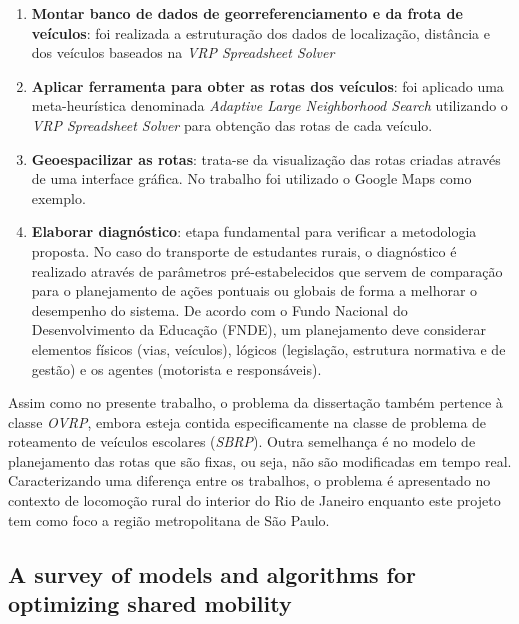 \begin{enumerate}
    \item \textbf{Montar banco de dados de georreferenciamento e da frota de veículos}: foi realizada a estruturação dos dados de localização, distância e dos veículos baseados na \emph{VRP Spreadsheet Solver}
    
    \item \textbf{Aplicar ferramenta para obter as rotas dos veículos}: foi aplicado uma meta-heurística denominada \emph{Adaptive Large Neighborhood Search} utilizando o \emph{VRP Spreadsheet Solver} para obtenção das rotas de cada veículo.    
    
    \item \textbf{Geoespacilizar as rotas}: trata-se da visualização das rotas criadas através de uma interface gráfica. No trabalho foi utilizado o Google Maps como exemplo.
    
    \item \textbf{Elaborar diagnóstico}: etapa fundamental para verificar a metodologia proposta. No caso do transporte de estudantes rurais, o diagnóstico é realizado através de parâmetros pré-estabelecidos que servem de comparação para o planejamento de ações pontuais ou globais de forma a melhorar o desempenho do sistema. De acordo com o Fundo Nacional do Desenvolvimento da Educação (FNDE), um planejamento deve considerar elementos físicos (vias, veículos), lógicos (legislação, estrutura normativa e de gestão) e os agentes (motorista e responsáveis). 
\end{enumerate}

Assim como no presente trabalho, o problema da dissertação também pertence à classe \emph{OVRP}, embora esteja contida especificamente na classe de problema de roteamento de veículos escolares (\emph{SBRP}). Outra semelhança é no modelo de planejamento das rotas que são fixas, ou seja, não são modificadas em tempo real. Caracterizando uma diferença entre os trabalhos, o problema é apresentado no contexto de locomoção rural do interior do Rio de Janeiro enquanto este projeto tem como foco a região metropolitana de São Paulo.


\subsection{A survey of models and algorithms for optimizing shared mobility \cite{MOURAD2019323}}


